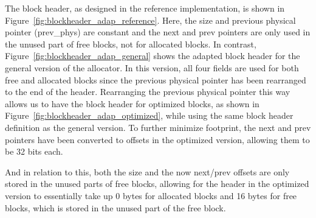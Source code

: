 The block header, as designed in the reference implementation, is shown in Figure~\ref{fig:blockheader_adap_reference}. Here, the size and previous physical pointer (prev\_phys) are constant and the next and prev pointers are only used in the unused part of free blocks, not for allocated blocks. In contrast, Figure~\ref{fig:blockheader_adap_general} shows the adapted block header for the general version of the allocator. In this version, all four fields are used for both free and allocated blocks since the previous physical pointer has been rearranged to the end of the header. Rearranging the previous physical pointer this way allows us to have the block header for optimized blocks, as shown in Figure~\ref{fig:blockheader_adap_optimized}, while using the same block header definition as the general version. To further minimize footprint, the next and prev pointers have been converted to offsets in the optimized version, allowing them to be 32 bits each.

And in relation to this, both the size and the now next/prev offsets are only stored in the unused parts of free blocks, allowing for the header in the optimized version to essentially take up 0 bytes for allocated blocks and 16 bytes for free blocks, which is stored in the unused part of the free block.


